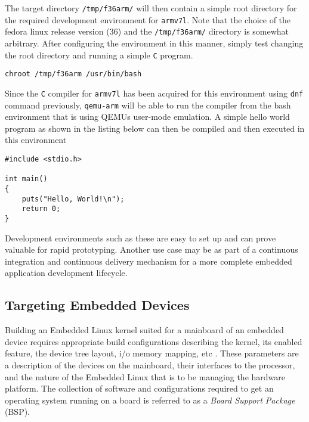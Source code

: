 The target directory \texttt{/tmp/f36arm/} will then contain a simple root directory for the required development environment for \texttt{armv7l}. Note that the choice of the fedora linux release version (36) and the \texttt{/tmp/f36arm/} directory is somewhat arbitrary. After configuring the environment in this manner, simply test changing the root directory and running a simple \texttt{C} program.

\begin{verbatim}
chroot /tmp/f36arm /usr/bin/bash
\end{verbatim}

Since the \texttt{C} compiler for \texttt{armv7l} has been acquired for this environment using \texttt{dnf} command previously, \texttt{qemu-arm} will be able to run the compiler from the bash environment that is using QEMU\textquotesingle s user-mode emulation. A simple hello world program as shown in the listing below can then be compiled and then executed in this environment

\begin{verbatim}
#include <stdio.h>

int main()
{
	puts("Hello, World!\n");
	return 0;
}
\end{verbatim}

Development environments such as these are easy to set up and can prove valuable for rapid prototyping. Another use case may be as part of a continuous integration and continuous delivery mechanism for a more complete embedded application development lifecycle.

\subsection{Targeting Embedded Devices}

Building an Embedded Linux kernel suited for a mainboard of an embedded device requires appropriate build configurations describing the kernel, its enabled feature, the device tree layout, i/o memory mapping, etc \cite{bootlin-port}. These parameters are a description of the devices on the mainboard, their interfaces to the processor, and the nature of the Embedded Linux that is to be managing the hardware platform. The collection of software and configurations required to get an operating system running on a board is referred to as a \textit{Board Support Package} (BSP).


